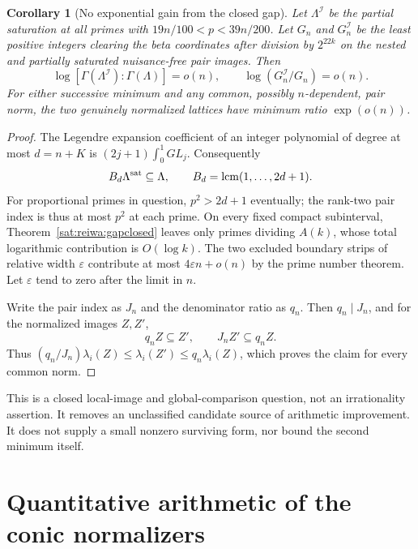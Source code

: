 \documentclass[11pt,a4paper]{article}
\numberwithin{equation}{section}
\newtheorem{corollary}[theorem]{Corollary}
\theoremstyle{definition}\newtheorem{definition}[theorem]{Definition}
\theoremstyle{remark}\newtheorem{remark}[theorem]{Remark}
\begin{document}
\begin{corollary}[No exponential gain from the closed gap]
\label{sat:reiwa:globalgap}
Let $\Lambda^{\mathcal I}$ be the partial saturation at all primes
with $19n/100<p<39n/200$. Let $G_n$ and $G_n^{\mathcal I}$ be
the least positive integers clearing the beta coordinates after
division by $2^{22k}$ on the nested and partially saturated
nuisance-free pair images. Then
\[
 \log[\Gamma(\Lambda^{\mathcal I}):\Gamma(\Lambda)]=o(n),
 \qquad \log(G_n^{\mathcal I}/G_n)=o(n).
\]
For either successive minimum and any common, possibly
$n$-dependent, pair norm, the two genuinely normalized lattices
have minimum ratio $\exp(o(n))$.
\end{corollary}
\begin{proof}
The Legendre expansion coefficient of an integer polynomial of
degree at most $d=n+K$ is
$(2j+1)\int_0^1GL_j$. Consequently
\[
 B_d\Lambda^{\rm sat}\subseteq\Lambda,
 \qquad B_d=\operatorname{lcm}(1,\ldots,2d+1).
\]
For proportional primes in question, $p^2>2d+1$ eventually;
the rank-two pair index is thus at most $p^2$ at each prime.
On every fixed compact subinterval, Theorem~\ref{sat:reiwa:gapclosed}
leaves only primes dividing $A(k)$, whose total logarithmic
contribution is $O(\log k)$. The two excluded boundary strips
of relative width $\varepsilon$ contribute at most
$4\varepsilon n+o(n)$ by the prime number theorem. Let
$\varepsilon$ tend to zero after the limit in $n$.

Write the pair index as $J_n$ and the denominator ratio as $q_n$.
Then $q_n\mid J_n$, and for the normalized images $Z,Z'$,
\[
 q_nZ\subseteq Z',\qquad J_nZ'\subseteq q_nZ.
\]
Thus $(q_n/J_n)\lambda_i(Z)\le\lambda_i(Z')\le q_n\lambda_i(Z)$,
which proves the claim for every common norm.
\end{proof}

This is a closed local-image and global-comparison question, not
an irrationality assertion. It removes an unclassified candidate
source of arithmetic improvement. It does not supply a small
nonzero surviving form, nor bound the second minimum itself.


\section{Quantitative arithmetic of the conic normalizers}
\label{height:keio:newheight}
\end{document}
